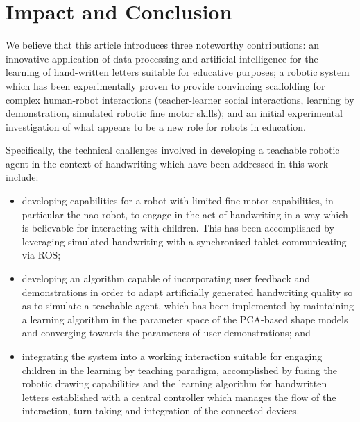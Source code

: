\documentclass{sig-alternate}
\begin{document}
\addtolength{\textheight}{-.5cm}   %

\section{Impact and Conclusion}\label{sec:conclusions}

We believe that this article introduces three noteworthy contributions: an innovative
application of data processing and artificial intelligence for the
learning of hand-written letters suitable for educative purposes; a robotic
system which has been experimentally proven to provide convincing scaffolding for
complex human-robot interactions (teacher-learner social interactions, learning by
demonstration, simulated robotic fine motor skills); and an initial experimental investigation of what appears to be a
new role for robots in education.

Specifically, the technical challenges involved in developing a teachable
robotic agent in the context of handwriting which have been addressed in this
work include:

\begin{itemize}

    \item developing capabilities for a robot with limited fine motor
        capabilities, in particular the {\sc nao} robot, to engage in the act of handwriting in a
        way which is believable for interacting with children. This has been
        accomplished by leveraging simulated handwriting with a synchronised
        tablet communicating via ROS;

    \item developing an algorithm capable of incorporating user feedback and
        demonstrations in order to adapt artificially generated handwriting quality so as
        to simulate a teachable agent, which has been implemented by maintaining
        a learning algorithm in the parameter space of the PCA-based shape models and
        converging towards the parameters of user demonstrations; and

    \item integrating the system into a working interaction suitable for
        engaging children in the learning by teaching paradigm, accomplished by
        fusing the robotic drawing capabilities and the learning algorithm for
        handwritten letters established with a central controller which manages
        the flow of the interaction, turn taking and integration of the connected 
	devices.

\end{itemize}
\end{document}
